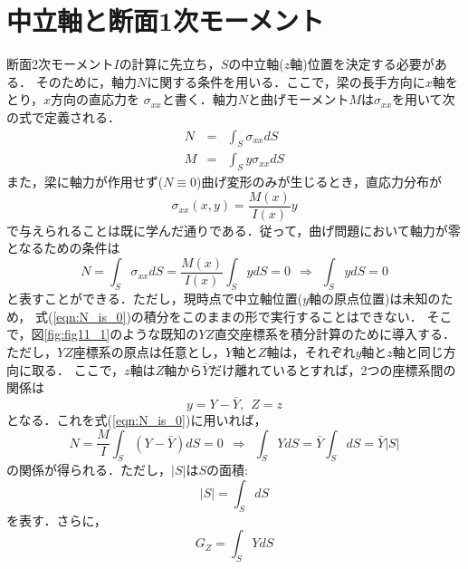 ﻿\documentclass[10pt,a4j]{jbook}
\begin{document}
\section{中立軸と断面1次モーメント}
断面2次モーメント$I$の計算に先立ち，$S$の中立軸($z$軸)位置を決定する必要がある．
そのために，軸力$N$に関する条件を用いる．ここで，梁の長手方向に$x$軸をとり，$x$方向の直応力を
$\sigma_{xx}$と書く．軸力$N$と曲げモーメント$M$は$\sigma_{xx}$を用いて次の式で定義される．
\begin{eqnarray}
	N &= & \int_S \sigma_{xx}dS 
	\label{eqn:def_N}
	\\
	M &= & \int_S y\sigma_{xx}dS 
	\label{eqn:def_M}
\end{eqnarray}
また，梁に軸力が作用せず($N\equiv 0$)曲げ変形のみが生じるとき，直応力分布が
\begin{equation}
	\sigma_{xx}(x,y)=\frac{M(x)}{I(x)}y
	\label{eqn:sig_xx}
\end{equation}
で与えられることは既に学んだ通りである．従って，曲げ問題において軸力が零となるための条件は
\begin{equation}
	N =  \int_S \sigma_{xx}dS = \frac{M(x)}{I(x)} \int_S ydS = 0 \ \ 
	\Rightarrow \ \ 
	\int_S y dS=0
	\label{eqn:N_is_0}
\end{equation}
と表すことができる．ただし，現時点で中立軸位置($y$軸の原点位置)は未知のため，
式(\ref{eqn:N_is_0})の積分をこのままの形で実行することはできない．
そこで，図\ref{fig:fig11_1}のような既知の$YZ$直交座標系を積分計算のために導入する．
ただし，$YZ$座標系の原点は任意とし，$Y$軸と$Z$軸は，それぞれ$y$軸と$z$軸と同じ方向に取る．
ここで，$z$軸は$Z$軸から$\bar{Y}$だけ離れているとすれば，2つの座標系間の関係は
\begin{equation}
	y=Y-\bar Y, \ \ Z=z
	\label{eqn:y_shift}
\end{equation}
となる．これを式(\ref{eqn:N_is_0})に用いれば，
\begin{equation}
	N=\frac{M}{I}\int_S \left(Y-\bar Y \right)dS=0 
	\ \ \Rightarrow \ \
	\int_S Y dS =
	\bar Y \int_S dS
	=
	\bar Y \left| S \right|
	\label{eqn:as_Nis0}
\end{equation}
の関係が得られる．ただし，$\left| S\right|$は$S$の面積:
\begin{equation}
	\left| S \right| = \int_S dS
	\label{eqn:area}
\end{equation}
を表す．さらに，
\begin{equation}
	G_Z=\int_S YdS 
	\label{eqn:GZ}
\end{equation}
\end{document}
